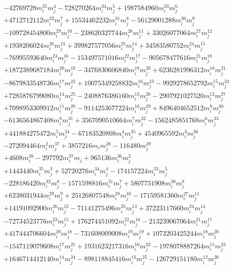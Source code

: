 {\begin{align*}
&-42769728m_i^{35}m_j^{4}-728270264m_i^{34}m_j^{5}+1987584960m_i^{33}m_j^{6}\\
&+4712712112m_i^{32}m_j^{7}+15534462232m_i^{31}m_j^{8}-56129001288m_i^{30}m_j^{9}\\
&-109728454800m_i^{29}m_j^{10}-238620327744m_i^{28}m_j^{11}+33026077064m_i^{27}m_j^{12}\\
&+1938206024m_i^{26}m_j^{13}+399827577056m_i^{25}m_j^{14}+34583580752m_i^{24}m_j^{15}\\
&-76995593640m_i^{23}m_j^{16}-153497571016m_i^{22}m_j^{17}-905678477616m_i^{21}m_j^{18}\\
&+1872389687184m_i^{20}m_j^{19}-3476830606840m_i^{19}m_j^{20}+6236281996312m_i^{18}m_j^{21}\\
&-8679833548736m_i^{17}m_j^{22}+10075349258832m_i^{16}m_j^{23}-9929278652792m_i^{15}m_j^{24}\\
&+7285876799080m_i^{14}m_j^{25}-2408876386160m_i^{13}m_j^{26}-2907921027520m_i^{12}m_j^{27}\\
&+7098953309912m_i^{11}m_j^{28}-9114253677224m_i^{10}m_j^{29}+8496404652512m_i^{9}m_j^{30}\\
&-6136564867408m_i^{8}m_j^{31}+3567090510664m_i^{7}m_j^{32}-1562485851768m_i^{6}m_j^{33}\\
&+441884275472m_i^{5}m_j^{34}-67183520808m_i^{4}m_j^{35}+4540965592m_i^{3}m_j^{36}\\
&-272094464m_i^{2}m_j^{37}+3857216m_im_j^{38}-116480m_j^{39}\\
&+4608m_i^{38}-297792m_i^{37}m_j+965136m_i^{36}m_j^{2}\\
&+1443440m_i^{35}m_j^{3}+52720276m_i^{34}m_j^{4}-174157224m_i^{33}m_j^{5}\\
&-228186420m_i^{32}m_j^{6}-1571598816m_i^{31}m_j^{7}+5807751908m_i^{30}m_j^{8}\\
&+6238031944m_i^{29}m_j^{9}+25126807548m_i^{28}m_j^{10}-17159581360m_i^{27}m_j^{11}\\
&+14191092900m_i^{26}m_j^{12}-71141275496m_i^{25}m_j^{13}+37223117660m_i^{24}m_j^{14}\\
&-72734523776m_i^{23}m_j^{15}+176274451092m_i^{22}m_j^{16}-213239067064m_i^{21}m_j^{17}\\
&+417444706604m_i^{20}m_j^{18}-731608009008m_i^{19}m_j^{19}+1073203425244m_i^{18}m_j^{20}\\
&-1547119079608m_i^{17}m_j^{21}+1931623217316m_i^{16}m_j^{22}-1978078887264m_i^{15}m_j^{23}\\
&+1646714412140m_i^{14}m_j^{24}-898118845416m_i^{13}m_j^{25}-126729151180m_i^{12}m_j^{26}\\

\end{align*}}
